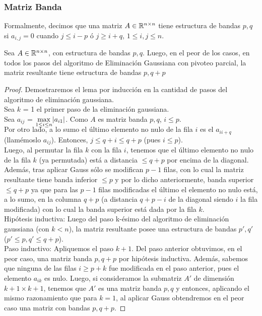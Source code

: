 \subsubsection{Matriz Banda}
Formalmente, decimos que una matriz $A \in \mathbb{R} ^{n\times n}$ tiene estructura de bandas $p,q$ si $a_{i,j} = 0$ cuando $j \leq i-p$ ó $j\geq i+q$, $1\leq i,j \leq n$.

\begin{lema}
Sea $A \in \mathbb{R}^{n \times n}$, con estructura de bandas $p, q$. Luego, en el peor de los casos, en todos los pasos del algoritmo de Eliminación Gaussiana con pivoteo parcial, la matriz resultante tiene estructura de bandas $p, q+p$
\end{lema}
\begin{proof}
Demostraremos el lema por inducción en la cantidad de pasos del algoritmo de eliminación gaussiana. \\
Sea $k$ = 1 el primer paso de la eliminación gaussiana. \\

Sea $a_{ij}$ = $\smash{\displaystyle\max_{1 \leq i \leq n}} |a_{i1}|$. Como $A$ es matriz banda $p, q$, $i \leq p$. \\

Por otro lado, a lo sumo el último elemento no nulo de la fila $i$ es el $a_{ii+q}$ (llamémoslo $a_{ij}$). Entonces, $j \leq q+i \leq q+p$ (pues $i \le p$). \\
Luego, al permutar la fila $k$ con la fila $i$, tenemos que el último elemento no nulo de la fila $k$ (ya permutada) está a distancia $\leq q+p$ por encima de la diagonal. Además, tras aplicar Gauss sólo se modifican $p-1$ filas, con lo cual la matriz resultante tiene banda inferior $\leq p$ y por lo dicho anteriormente, banda superior $\leq q+p$ ya que para las $p-1$ filas modificadas el último el elemento no nulo está, a lo sumo, en la columna $q+p$ (a distancia $q+p-i$ de la diagonal siendo $i$ la fila modificada) con lo cual la banda superior está dada por la fila $k$. \\

Hipótesis inductiva: Luego del paso k-ésimo del algoritmo de eliminación gaussiana (con $k < n$), la matriz resultante posee una estructura de bandas $p', q'$ ($p' \leq p, q' \leq q+p$).\\

Paso inductivo: Apliquemos el paso $k+1$. Del paso anterior obtuvimos, en el peor caso, una matriz banda $p, q+p$ por hipótesis inductiva. Además, sabemos que ninguna de las filas $i \geq p+k$ fue modificada en el paso anterior, pues el elemento $a_{ik}$ es nulo. Luego, si consideramos la submatriz $A'$ de dimensión $k+1 \times k+1$, tenemos que $A'$ es una matriz banda $p, q$ y entonces, aplicando el mismo razonamiento que para $k=1$, al aplicar Gauss obtendremos en el peor caso una matriz con bandas $p, q+p$.
\end{proof}

